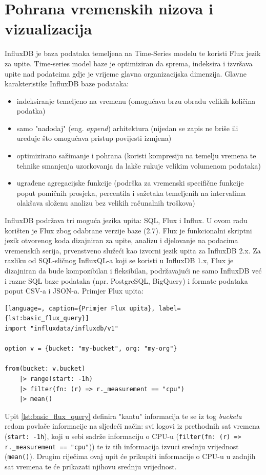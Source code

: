 \section{Pohrana vremenskih nizova i vizualizacija}
InfluxDB je baza podataka temeljena na Time-Series modelu te koristi Flux jezik za upite. Time-series model baze je optimiziran da sprema, indeksira i izvršava upite nad podatcima gdje je vrijeme 
glavna organizacijska dimenzija.\cite{influxdb_docs} Glavne karakteristike InfluxDB baze podataka: \begin{itemize}
    \item indeksiranje temeljeno na vremenu (omogućava brzu obradu velikih količina podatka)
    \item samo "nadodaj" (eng. \textit{append}) arhitektura (nijedan se zapis ne briše ili uređuje što omogućava pristup povijesti izmjena)
    \item optimizirano sažimanje i pohrana (koristi kompresiju na temelju vremena te tehnike smanjenja uzorkovanja da lakše rukuje velikim volumenom podataka)
    \item ugrađene agregacijske funkcije (podrška za vremenski specifične funkcije poput pomičnih prosjeka, percentila i sažetaka temeljenih na intervalima olakšava složenu analizu bez velikih računalnih troškova)
\end{itemize}
InfluxDB podržava tri moguća jezika upita: SQL, Flux i Influx. U ovom radu korišten je Flux zbog odabrane verzije baze (2.7). Flux je funkcionalni skriptni jezik otvorenog koda dizajniran za upite, 
analizu i djelovanje na podacima vremenskih serija, prvenstveno služeći kao izvorni jezik upita za InfluxDB 2.x.\cite{flux_getstarted}\cite{flux_basics_video} Za razliku od SQL-sličnog InfluxQL-a koji se koristi u InfluxDB 1.x, 
Flux je dizajniran da bude kompozibilan i fleksibilan, podržavajući ne samo InfluxDB već i razne SQL baze podataka (npr. PostgreSQL, BigQuery) i formate podataka poput CSV-a i JSON-a.
Primjer Flux upita: \cite{flux_query_basics}
\newpage
\begin{lstlisting}[language=, caption={Primjer Flux upita}, label={lst:basic_flux_query}]
import "influxdata/influxdb/v1"

option v = {bucket: "my-bucket", org: "my-org"}

from(bucket: v.bucket)
    |> range(start: -1h)
    |> filter(fn: (r) => r._measurement == "cpu")
    |> mean()
\end{lstlisting}
Upit \ref{lst:basic_flux_query} definira "kantu" informacija te se iz tog \textit{bucketa} redom povlače informacije na sljedeći način: svi logovi iz prethodnih sat vremena (\lstinline|start: -1h|),
koji u sebi sadrže informaciju o CPU-u (\lstinline|filter(fn: (r) => r._measurement == "cpu"|)) te iz tih informacija izvuci srednju vrijednost (\lstinline|mean()|). Drugim riječima ovaj upit će
prikupiti informacije o CPU-u u zadnjih sat vremena te će prikazati njihovu srednju vrijednost.

